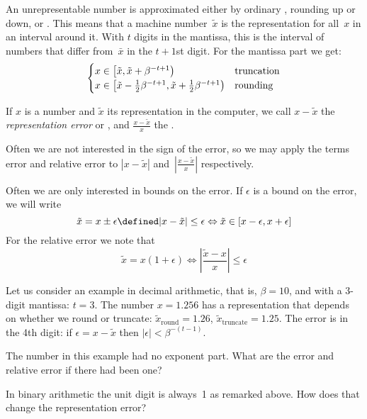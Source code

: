 An unrepresentable number is approximated either by
ordinary , rounding up or down, or .
This means that a machine number~$\tilde x$ is the representation for
all~$x$ in an interval around it.  With $t$ digits in the
mantissa, this is the interval of numbers that differ
from~$\bar x$ in the $t+1$st digit. For the mantissa
part we get:
\begin{equation}
\begin{cases}
  x\in \left[\tilde x,\tilde x+\beta^{-t+1}\right)&\hbox{truncation}\\
  x\in \left[\tilde x-\frac12 \beta^{-t+1},\tilde x+\frac12 \beta^{-t+1}\right)
    &\hbox{rounding}
\end{cases}
\end{equation}

If $x$ is a number and $\tilde x$ its representation in the computer,
we call $x-\tilde x$ the \emph{representation error} or
, and $\frac{x-\tilde x}{x}$
the .

Often we are not
interested in the sign of the error, so we may apply the terms error
and relative error to $|x-\tilde x|$ and~$|\frac{x-\tilde x}{x}|$
respectively.

Often we are only interested in bounds on the error. If $\epsilon$ is
a bound on the error, we will write
\begin{equation}
  \tilde x = x\pm\epsilon \defined
    |x-\tilde x|\leq\epsilon 
    \Leftrightarrow \tilde x\in[x-\epsilon,x+\epsilon]
\end{equation}
For the relative error we note that
\begin{equation}
  \tilde x =x(1+\epsilon) \Leftrightarrow
    \left|\frac{\tilde x-x}{x}\right|\leq \epsilon
\end{equation}

Let us consider an example in decimal arithmetic, that is, $\beta=10$,
and with a 3-digit mantissa: $t=3$.  The number $x=1.256$ has a
representation that depends on whether we round or truncate: $\tilde
x_{\mathrm{round}}=1.26$, $\tilde x_{\mathrm{truncate}}=1.25$.
The error is in the 4th digit: if $\epsilon=x-\tilde x$ 
then $|\epsilon|<\beta^{-(t-1)}$.

\begin{exercise}
The number in this example had no exponent part. What are the error
and relative error if there had been one?
\end{exercise}
\begin{exercise}
  In binary arithmetic the unit digit is always~1 as remarked above.
  How does that change the representation error?
\end{exercise}

